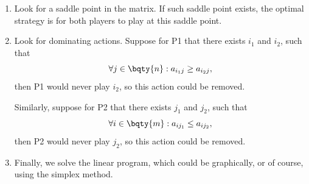 \begin{enumerate}
    \item Look for a saddle point in the matrix. If such saddle point exists, the optimal strategy is for both players to play at this saddle point.
    \item Look for dominating actions. Suppose for P1 that there exists \(i_1\) and \(i_2\), such that
    \[
        \forall j \in \bqty{n}: a_{i_1 j} \geq a_{i_2 j},
    \]
    then P1 would never play \(i_2\), so this action could be removed.

    Similarly, suppose for P2 that there exists \(j_1\) and \(j_2\), such that
    \[
        \forall i \in \bqty{m}: a_{i j_1} \leq a_{i j_2},
    \]
    then P2 would never play \(j_2\), so this action could be removed.
    \item Finally, we solve the linear program, which could be graphically, or of course, using the simplex method.
\end{enumerate}

